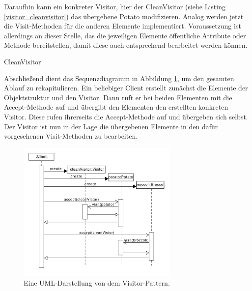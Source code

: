 Daraufhin kann ein konkreter Visitor, hier der CleanVisitor (siehe Listing \ref{visitor_cleanvisitor}) das übergebene Potato modifizieren. Analog werden jetzt die Visit-Methoden für die anderen Elemente implementiert. Voraussetzung ist allerdings an dieser Stelle, das die jeweiligen Elemente öffentliche Attribute oder Methode bereitstellen, damit diese auch entsprechend bearbeitet werden können.

\begin{listing}[h!]
   \centering
   \caption{CleanVisitor}
    \label{visitor_cleanvisitor}
\end{listing}  

Abschließend dient das Sequenzdiagramm in Abbildung \ref{visitor_sequenzdiagramm}, um den gesamten Ablauf zu rekapitulieren. Ein beliebiger Client erstellt zunächst die Elemente der Objektstruktur und den Visitor. Dann ruft er bei beiden Elementen mit die Accept-Methode auf und übergibt den Elementen den erstellten konkreten Visitor. Diese rufen ihrerseits die Accept-Methode auf und übergeben sich selbst. Der Visitor ist nun in der Lage die übergebenen Elemente in den dafür vorgesehenen Visit-Methoden zu bearbeiten.


\begin{figure}[htbp]
\centering
\includegraphics[width=0.7\textwidth]{./paper/visitor/visitor_sequenz}
\caption{Eine UML-Darstellung von dem Visitor-Pattern.}
\label{visitor_sequenzdiagramm}
\end{figure} 





